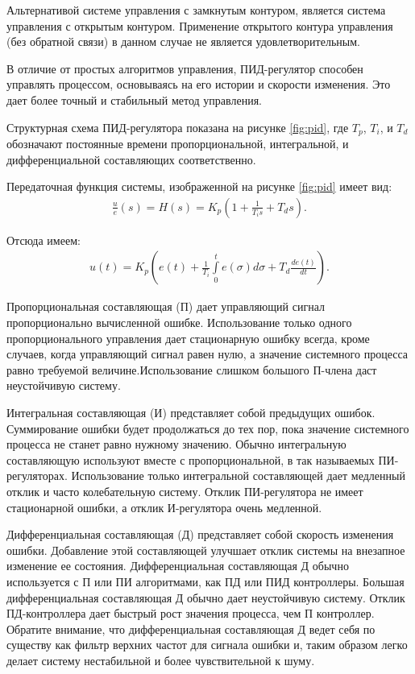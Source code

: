         Альтернативой системе управления с замкнутым контуром, является система
        управления с открытым контуром. Применение открытого контура управления
        (без обратной связи) в данном случае не является удовлетворительным.

        В отличие от простых алгоритмов управления, ПИД-регулятор способен
        управлять процессом, основываясь на его истории и скорости изменения.
        Это дает более точный и стабильный метод управления.

        Структурная схема ПИД-регулятора показана на рисунке \ref{fig:pid}, где
        $T_p$, $T_i$, и $T_d$ обозначают постоянные времени пропорциональной,
        интегральной, и дифференциальной составляющих соответственно.

        Передаточная функция системы, изображенной на рисунке \ref{fig:pid}
        имеет вид:
        \begin{gather*}
            \frac{u}{e}(s) = H(s) = K_p \left(1 + \frac{1}{T_i s} + T_d s\right).
        \end{gather*}

        Отсюда имеем:
        \begin{gather*}
            u(t) = K_p \left( e(t)+\frac{1}{T_i} 
                \int \limits_0^t e(\sigma)d \sigma + T_d \frac{de(t)}{dt} \right).
        \end{gather*}

        Пропорциональная составляющая (П) дает управляющий сигнал
        пропорционально вычисленной ошибке. Использование только одного
        пропорционального управления дает стационарную ошибку всегда, кроме
        случаев, когда управляющий сигнал равен нулю, а значение системного
        процесса равно требуемой величине.Использование слишком большого
        П-члена даст неустойчивую систему. 

        Интегральная составляющая (И) представляет собой предыдущих ошибок.
        Суммирование ошибки будет продолжаться до тех пор, пока значение
        системного процесса не станет равно нужному значению. Обычно
        интегральную составляющую используют вместе с пропорциональной, в так
        называемых ПИ-регуляторах. Использование только интегральной
        составляющей дает медленный отклик и часто колебательную систему.
        Отклик ПИ-регулятора не имеет стационарной ошибки, а отклик
        И-регулятора очень медленной.

        Дифференциальная составляющая (Д) представляет собой скорость изменения
        ошибки. Добавление этой составляющей улучшает отклик системы на
        внезапное изменение ее состояния. Дифференциальная составляющая Д
        обычно используется с П или ПИ алгоритмами, как ПД или ПИД контроллеры.
        Большая дифференциальная составляющая Д обычно дает неустойчивую
        систему. Отклик ПД-контроллера дает быстрый рост значения процесса, чем
        П контроллер. Обратите внимание, что дифференциальная составляющая Д
        ведет себя по существу как фильтр верхних частот для сигнала ошибки и,
        таким образом легко делает систему нестабильной и более чувствительной
        к шуму.

